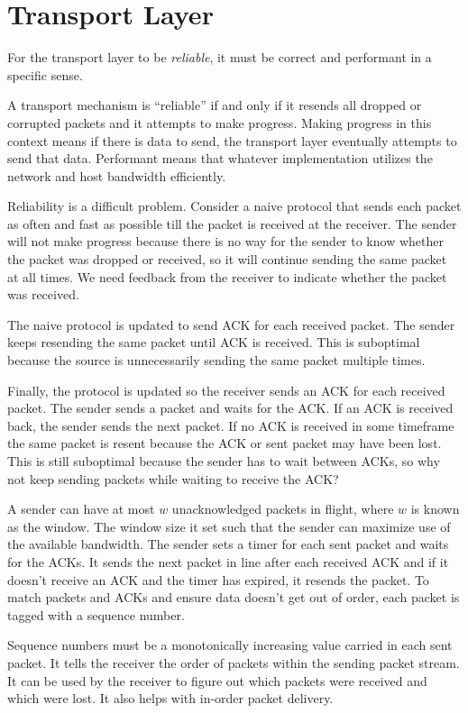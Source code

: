 \section{Transport Layer}

For the transport layer to be \emph{reliable}, it must be
correct and performant in a specific sense.

A transport mechanism is “reliable” if and only if it resends
all dropped or corrupted packets and it attempts to make progress.
Making progress in this context means if there is data to send,
the transport layer eventually attempts to send that data.
Performant means that whatever implementation utilizes the network
and host bandwidth efficiently.

Reliability is a difficult problem. Consider a naive protocol that
sends each packet as often and fast as possible till the packet is
received at the receiver. The sender will not make progress because
there is no way for the sender to know whether the packet was dropped or received,
so it will continue sending the same packet at all times. We need
feedback from the receiver to indicate whether the packet was received.

The naive protocol is updated to send ACK for each received packet.
The sender keeps resending the same packet until ACK is received.
This is suboptimal because the source is unnecessarily sending the same
packet multiple times.

Finally, the protocol is updated so the receiver sends an ACK for
each received packet. The sender sends a packet and waits for the ACK.
If an ACK is received back, the sender sends the next packet.
If no ACK is received in some timeframe the same packet is resent
because the ACK or sent packet may have been lost. This is still
suboptimal because the sender has to wait between ACKs, so why not
keep sending packets while waiting to receive the ACK?

A sender can have at most $w$ unacknowledged packets in flight, where
$w$ is known as the window. The window size it set such that the sender
can maximize use of the available bandwidth. The sender sets a timer for each sent
packet and waits for the ACKs. It sends the next packet in line after
each received ACK and if it doesn't receive an ACK and the timer has
expired, it resends the packet. To match packets and ACKs and ensure
data doesn't get out of order, each packet is tagged with a sequence
number.

Sequence numbers must be a monotonically increasing value carried in
each sent packet. It tells the receiver the order of packets within the
sending packet stream. It can be used by the receiver to figure out
which packets were received and which were lost. It also helps with
in-order packet delivery.

